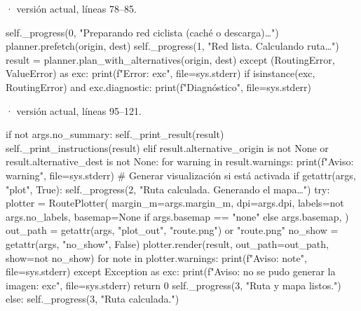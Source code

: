 \documentclass[11pt,a4paper]{article}
\begin{document}
\smallskip
{\footnotesize\texttt{} · versión actual, líneas 78--85.}\par
\begin{Codigo}[firstnumber=78]
            self._progress(0, "Preparando red ciclista (caché o descarga)…")
            planner.prefetch(origin, dest)
            self._progress(1, "Red lista. Calculando ruta…")
            result = planner.plan_with_alternatives(origin, dest)
        except (RoutingError, ValueError) as exc:
            print(f"Error: {exc}", file=sys.stderr)
            if isinstance(exc, RoutingError) and exc.diagnostic:
                print(f"Diagnóstico", file=sys.stderr)
\end{Codigo}

\smallskip
{\footnotesize\texttt{} · versión actual, líneas 95--121.}\par
\begin{Codigo}[firstnumber=95]
        if not args.no_summary:
            self._print_result(result)
            self._print_instructions(result)
        elif result.alternative_origin is not None or result.alternative_dest is not None:
            for warning in result.warnings:
                print(f"Aviso: {warning}", file=sys.stderr)
        # Generar visualización si está activada
        if getattr(args, "plot", True):
            self._progress(2, "Ruta calculada. Generando el mapa…")
            try:
                plotter = RoutePlotter(
                    margin_m=args.margin_m,
                    dpi=args.dpi,
                    labels=not args.no_labels,
                    basemap=None if args.basemap == "none" else args.basemap,
                )
                out_path = getattr(args, "plot_out", "route.png") or "route.png"
                no_show = getattr(args, "no_show", False)
                plotter.render(result, out_path=out_path, show=not no_show)
                for note in plotter.warnings:
                    print(f"Aviso: {note}", file=sys.stderr)
            except Exception as exc:
                print(f"Aviso: no se pudo generar la imagen: {exc}", file=sys.stderr)
                return 0
            self._progress(3, "Ruta y mapa listos.")
        else:
            self._progress(3, "Ruta calculada.")
\end{Codigo}
\end{document}
